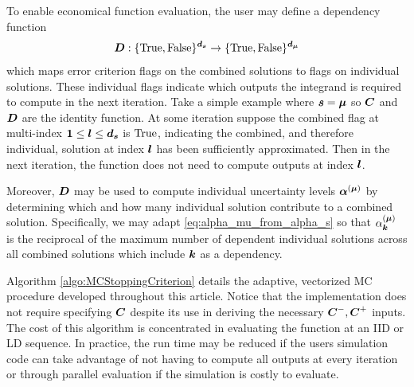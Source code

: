 \documentclass{article}[12pt]
\begin{document}
To enable economical function evaluation, the user may define a dependency function
$$\boldsymbol{D}: \{\text{True},\text{False}\}^{\boldsymbol{d}_{\boldsymbol{s}}} \to \{\text{True},\text{False}\}^{\boldsymbol{d}_{\boldsymbol{\mu}}}$$ 
which maps error criterion flags on the combined solutions to flags on individual solutions. These individual flags indicate which outputs the integrand is required to compute in the next iteration. Take a simple example where  $\boldsymbol{s}=\boldsymbol{\mu}$ so $\boldsymbol{C}$ and $\boldsymbol{D}$ are the identity function. At some iteration suppose the combined flag at multi-index $\boldsymbol{1} \leq \boldsymbol{l} \leq \boldsymbol{d}_{\boldsymbol{s}}$ is $\text{True}$, indicating the combined, and therefore individual, solution at index $\boldsymbol{l}$ has been sufficiently approximated. Then in the next iteration, the function does not need to compute outputs at index $\boldsymbol{l}$.

Moreover, $\boldsymbol{D}$ may be used to compute individual uncertainty levels $\boldsymbol{\alpha}^{(\boldsymbol{\mu})}$ by determining which and how many individual solution contribute to a combined solution. Specifically, we may adapt \eqref{eq:alpha_mu_from_alpha_s} so that 
$\alpha_{\boldsymbol{k}}^{(\boldsymbol{\mu})}$ is the reciprocal of the maximum number of dependent individual solutions across all combined solutions which include $\boldsymbol{k}$ as a dependency.

Algorithm \ref{algo:MCStoppingCriterion} details the adaptive, vectorized MC procedure developed throughout this article. Notice that the implementation does not require specifying $\boldsymbol{C}$ despite its use in deriving the necessary $\boldsymbol{C}^-,\boldsymbol{C}^+$ inputs. The cost of this algorithm is concentrated in evaluating the function at an IID or LD sequence. In practice, the run time may be reduced if the users simulation code can take advantage of not having to compute all outputs at every iteration or through parallel evaluation if the simulation is costly to evaluate.
\end{document}
